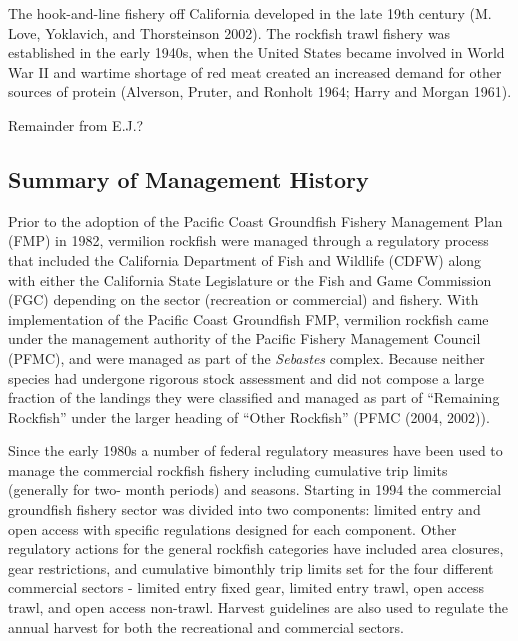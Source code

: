 \documentclass[11pt,
  english,
  a4paper,
]{article}
\begin{document}
\leavevmode\tagmcend\tagstructend

The hook-and-line fishery off California developed in the late 19th century {(M. Love, Yoklavich, and Thorsteinson 2002)\leavevmode\tagmcend\tagstructend}. The rockfish trawl fishery was established in the early 1940s, when the United States became involved in World War II and wartime shortage of red meat created an increased demand for other sources of protein {(Alverson, Pruter, and Ronholt 1964; Harry and Morgan 1961)\leavevmode\tagmcend\tagstructend}.

Remainder from E.J.?


\hypertarget{summary-of-management-history}{%
\subsection{Summary of Management History}\label{summary-of-management-history}}

\leavevmode\tagmcend\tagstructend

Prior to the adoption of the Pacific Coast Groundfish Fishery Management Plan (FMP) in 1982, vermilion rockfish were managed through a regulatory process that included the California Department of Fish and Wildlife (CDFW) along with either the California State Legislature or the Fish and Game Commission (FGC) depending on the sector (recreation or commercial) and fishery. With implementation of the Pacific Coast Groundfish FMP, vermilion rockfish came under the management authority of the Pacific Fishery Management Council (PFMC), and were managed as part of the \emph{Sebastes} complex. Because neither species had undergone rigorous stock assessment and did not compose a large fraction of the landings they were classified and managed as part of ``Remaining Rockfish'' under the larger heading of ``Other Rockfish'' (PFMC {(2004, 2002)\leavevmode\tagmcend\tagstructend}).

Since the early 1980s a number of federal regulatory measures have been used to manage the commercial rockfish fishery including cumulative trip limits (generally for two- month periods) and seasons. Starting in 1994 the commercial groundfish fishery sector was divided into two components: limited entry and open access with specific regulations designed for each component. Other regulatory actions for the general rockfish categories have included area closures, gear restrictions, and cumulative bimonthly trip limits set for the four different commercial sectors - limited entry fixed gear, limited entry trawl, open access trawl, and open access non-trawl. Harvest guidelines are also used to regulate the annual harvest for both the recreational and commercial sectors.
\end{document}
